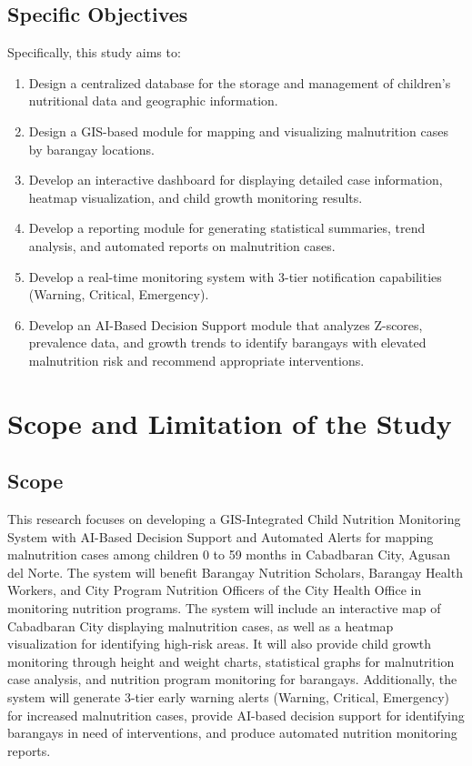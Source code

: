 \documentclass[12pt, a4paper]{report}
\begin{document}
\subsection{Specific Objectives}
Specifically, this study aims to:
\begin{enumerate}
    \item Design a centralized database for the storage and management of children's nutritional data and geographic information.
    \item Design a GIS-based module for mapping and visualizing malnutrition cases by barangay locations.
    \item Develop an interactive dashboard for displaying detailed case information, heatmap visualization, and child growth monitoring results.
    \item Develop a reporting module for generating statistical summaries, trend analysis, and automated reports on malnutrition cases.
    \item Develop a real-time monitoring system with 3-tier notification capabilities (Warning, Critical, Emergency).
    \item Develop an AI-Based Decision Support module that analyzes Z-scores, prevalence data, and growth trends to identify barangays with elevated malnutrition risk and recommend appropriate interventions.
\end{enumerate}

\section{Scope and Limitation of the Study}
\label{sec:scope}

\subsection{Scope}
This research focuses on developing a GIS-Integrated Child Nutrition Monitoring System with AI-Based Decision Support and Automated Alerts for mapping malnutrition cases among children 0 to 59 months in Cabadbaran City, Agusan del Norte. The system will benefit Barangay Nutrition Scholars, Barangay Health Workers, and City Program Nutrition Officers of the City Health Office in monitoring nutrition programs. The system will include an interactive map of Cabadbaran City displaying malnutrition cases, as well as a heatmap visualization for identifying high-risk areas. It will also provide child growth monitoring through height and weight charts, statistical graphs for malnutrition case analysis, and nutrition program monitoring for barangays. Additionally, the system will generate 3-tier early warning alerts (Warning, Critical, Emergency) for increased malnutrition cases, provide AI-based decision support for identifying barangays in need of interventions, and produce automated nutrition monitoring reports.
\end{document}
